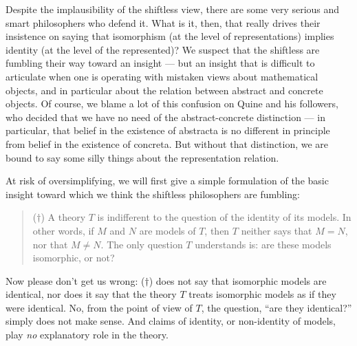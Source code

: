 Despite the implausibility of the shiftless view, there are some very
serious and smart philosophers who defend it.  What is it, then, that
really drives their insistence on saying that isomorphism (at the
level of representations) implies identity (at the level of the
represented)?  We suspect that the shiftless are fumbling their way
toward an insight --- but an insight that is difficult to articulate
when one is operating with mistaken views about mathematical objects,
and in particular about the relation between abstract and concrete
objects.  Of course, we blame a lot of this confusion on Quine and his
followers, who decided that we have no need of the abstract-concrete
distinction --- in particular, that belief in the existence of
abstracta is no different in principle from belief in the existence of
concreta.  But without that distinction, we are bound to say some
silly things about the representation relation.

At risk of oversimplifying, we will first give a simple formulation of
the basic insight toward which we think the shiftless philosophers are
fumbling:
\begin{quote} ($\dagger$) A theory $T$ is indifferent to the question
  of the identity of its models.  In other words, if $M$ and $N$ are
  models of $T$, then $T$ neither says that $M=N$, nor that $M\neq N$.
  The only question $T$ understands is: are these models isomorphic,
  or not?
\end{quote}
Now please don't get us wrong: ($\dagger$) does not say that
isomorphic models are identical, nor does it say that the theory $T$
treats isomorphic models as if they were identical.  No, from the
point of view of $T$, the question, ``are they identical?'' simply
does not make sense.  And claims of identity, or non-identity of
models, play {\it no} explanatory role in the theory.

